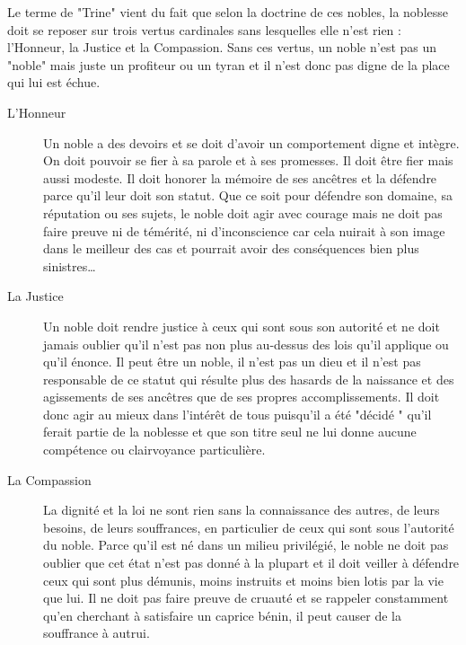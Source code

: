 \documentclass[twoside]{article}
\begin{document}
Le terme de "Trine" vient du fait que selon la doctrine de ces nobles, la noblesse doit se reposer sur trois vertus cardinales sans lesquelles elle n'est rien : l'Honneur, la Justice et la Compassion. Sans ces vertus, un noble n'est pas un "noble" mais juste un profiteur ou un tyran et il n'est donc pas digne de la place qui lui est échue.
\begin{description}
	\item[L'Honneur] Un noble a des devoirs et se doit d'avoir un comportement digne et intègre. On doit pouvoir se fier à sa parole et à ses promesses. Il doit être fier mais aussi modeste. Il doit honorer la mémoire de ses ancêtres et la défendre parce qu'il leur doit son statut. Que ce soit pour défendre son domaine, sa réputation ou ses sujets, le noble doit agir avec courage mais ne doit pas faire preuve ni de témérité, ni d'inconscience car cela nuirait  à son image dans le meilleur des cas et pourrait avoir des conséquences bien plus sinistres\ldots
	\item[La Justice] Un noble doit rendre justice à ceux qui sont sous son autorité et ne doit jamais oublier qu'il n'est pas non plus au-dessus des lois qu'il applique ou qu'il énonce. Il peut être un noble, il n'est pas un dieu et il n'est pas responsable de ce statut qui résulte plus des hasards de la naissance et des agissements de ses ancêtres que de ses propres accomplissements. Il doit donc agir au mieux dans l'intérêt de tous puisqu'il a été "décidé " qu'il ferait partie de la noblesse et que son titre seul ne lui donne aucune compétence ou clairvoyance particulière.
	\item[La Compassion] La dignité et la loi ne sont rien sans la connaissance des autres, de leurs besoins, de leurs souffrances, en particulier de ceux qui sont sous l'autorité du noble. Parce qu'il est né dans un milieu privilégié, le noble ne doit pas oublier que cet état n'est pas donné à la plupart et il doit veiller à défendre ceux qui sont plus démunis, moins instruits et moins bien lotis par la vie que lui. Il ne doit pas faire preuve de cruauté et se rappeler constamment qu'en cherchant à satisfaire un caprice bénin, il peut causer de la souffrance à autrui.
\end{description}
\end{document}
